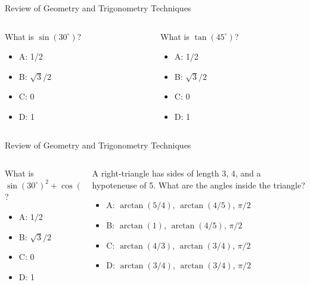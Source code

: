 \documentclass{beamer}
\begin{document}
\begin{frame}{Review of Geometry and Trigonometry Techniques}
\begin{columns}[T]
\begin{column}{0.5\textwidth}
What is $\sin(30^{\circ})$?
\begin{itemize}
\item A: 1/2
\item B: $\sqrt{3}/2$
\item C: 0
\item D: 1
\end{itemize}
\end{column}
\begin{column}{0.5\textwidth}
What is $\tan(45^{\circ})$?
\begin{itemize}
\item A: 1/2
\item B: $\sqrt{3}/2$
\item C: 0
\item D: 1
\end{itemize}
\end{column}
\end{columns}
\end{frame}

\begin{frame}{Review of Geometry and Trigonometry Techniques}
\small
\begin{columns}[T]
\begin{column}{0.4\textwidth}
What is $\sin(30^{\circ})^2+\cos(30^{\circ})^2$?
\begin{itemize}
\item A: 1/2
\item B: $\sqrt{3}/2$
\item C: 0
\item D: 1
\end{itemize}
\end{column}
\begin{column}{0.6\textwidth}
A right-triangle has sides of length 3, 4, and a hypoteneuse of 5.  What are the angles inside the triangle?
\begin{itemize}
\item A: $\arctan(5/4)$, $\arctan(4/5)$, $\pi/2$
\item B: $\arctan(1)$, $\arctan(4/5)$, $\pi/2$
\item C: $\arctan(4/3)$, $\arctan(3/4)$, $\pi/2$
\item D: $\arctan(3/4)$, $\arctan(3/4)$, $\pi/2$
\end{itemize}
\end{column}
\end{columns}
\end{frame}
\end{document}
